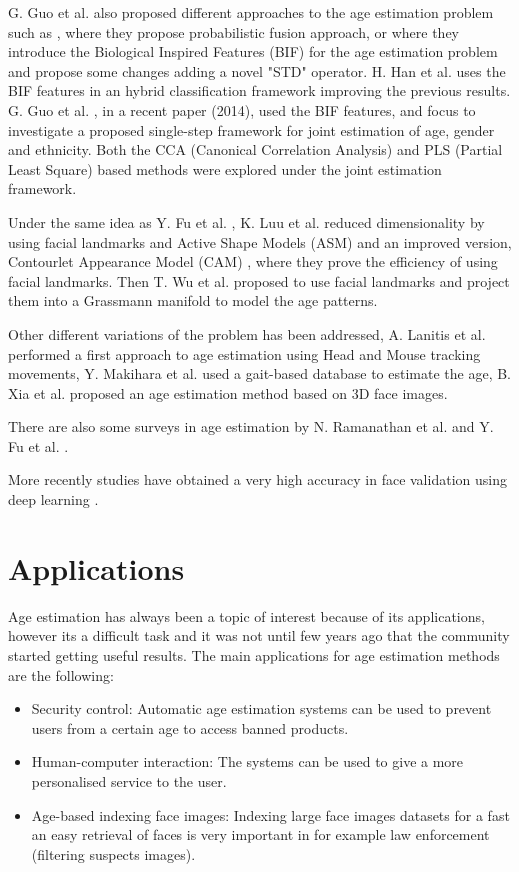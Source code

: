 G. Guo et al. also proposed different approaches to the age estimation problem such as
\cite{4563041}, where they propose probabilistic fusion approach, or \cite{conf/cvpr/GuoMFH09} where they introduce the Biological Inspired Features (BIF) for the age estimation problem and propose some changes adding a novel "STD" operator. H. Han et al. \cite{han:age} uses the BIF features in an hybrid classification framework improving the previous results. G. Guo et al. \cite{Guo2014761}, in a recent paper (2014), used the BIF features, and focus to investigate a proposed single-step framework for joint estimation of age, gender and ethnicity. Both the CCA (Canonical Correlation Analysis) and PLS (Partial Least Square) based methods were explored under the joint estimation framework.

Under the same idea as Y. Fu et al. \cite{4284917}, K. Luu et al. \cite{Luu:2009:AEU:1736406.1736456, LuuSSBS11} reduced dimensionality by using facial landmarks and Active Shape Models (ASM) \cite{Luu:2009:AEU:1736406.1736456} and an improved version, Contourlet Appearance Model (CAM) \cite{LuuSSBS11}, where they prove the efficiency of using facial landmarks. Then T. Wu et al. \cite{journals/tifs/WuTC12} proposed to use facial landmarks and project them into a Grassmann manifold to model the age patterns.

Other different variations of the problem has been addressed, A. Lanitis et al. \cite{5463396} performed a first approach to age estimation using Head and Mouse tracking movements, Y. Makihara et al. \cite{6117531} used a gait-based database to estimate the age, B. Xia et al. \cite{xia:hal-00904007} proposed an age estimation method based on 3D face images.

There are also some surveys in age estimation by N. Ramanathan et al. \cite{Ramanathan2009131} and Y. Fu et al. \cite{5406526}.

More recently studies have obtained a very high accuracy in face validation using deep learning \cite{facebook}.


\section{Applications}
Age estimation has always been a topic of interest because of its applications, however its a difficult task and it was not until few years ago that the community started getting useful results. The main applications for age estimation methods are the following:

\begin{itemize}
	\item Security control: Automatic age estimation systems can be used to prevent users from a certain age to access banned products.
	\item Human-computer interaction: The systems can be used to give a more personalised service to the user.
	\item Age-based indexing face images: Indexing large face images datasets for a fast an easy retrieval of faces is very important in for example law enforcement (filtering suspects images).
\end{itemize}

